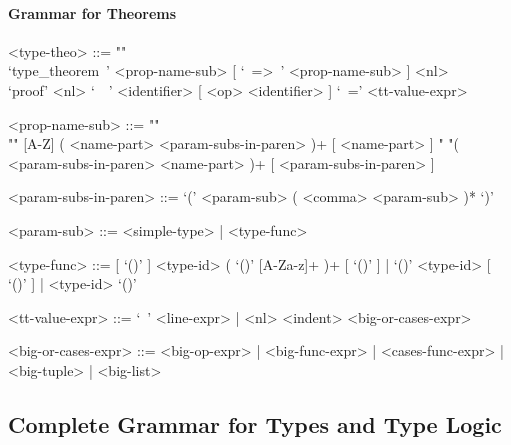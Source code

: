 \documentclass{article}
\begin{document}
\paragraph{Grammar for Theorems}

\begin{grammar}
<type-theo> ::= ""\\
`type_theorem\ ' <prop-name-sub> [ `\ =>\ ' <prop-name-sub> ] <nl> \\
`proof' <nl> `\ \ ' <identifier> [ <op> <identifier> ] `\ =' <tt-value-expr>

<prop-name-sub> ::=  ""\\""
[A-Z] ( <name-part> <param-subs-in-paren> )+ [ <name-part> ]
\alt " "( <param-subs-in-paren> <name-part> )+ [ <param-subs-in-paren> ]

<param-subs-in-paren> ::= `(' <param-sub> ( <comma> <param-sub> )* `)'

<param-sub> ::= <simple-type> | <type-func>

<type-func> ::=
[ `()' ] <type-id> ( `()' [A-Za-z]+ )+ [ `()' ] | `()' <type-id> [ `()' ] |
<type-id> `()'

<tt-value-expr> ::= `\ ' <line-expr> | <nl> <indent> <big-or-cases-expr>

<big-or-cases-expr> ::=
<big-op-expr> | <big-func-expr> | <cases-func-expr> | <big-tuple> | <big-list>
\end{grammar} 

\subsection{Complete Grammar for Types and Type Logic}
\end{document}
